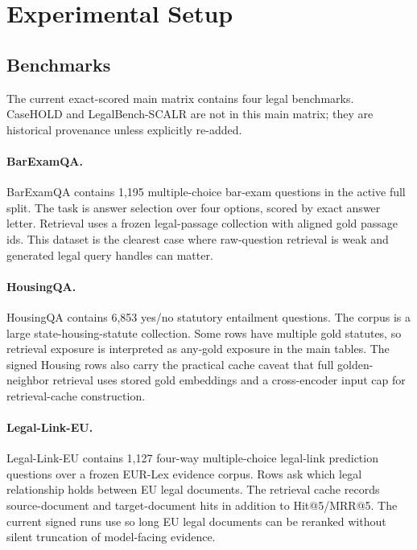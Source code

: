 \section{Experimental Setup}\label{sec:experiment}

\subsection{Benchmarks}

The current exact-scored main matrix contains four legal benchmarks. CaseHOLD
and LegalBench-SCALR are not in this main matrix; they are historical
provenance unless explicitly re-added.

\paragraph{BarExamQA.}
BarExamQA contains 1,195 multiple-choice bar-exam questions in the active full
split. The task is answer selection over four options, scored by exact answer
letter. Retrieval uses a frozen legal-passage collection with aligned gold
passage ids. This dataset is the clearest case where raw-question retrieval is
weak and generated legal query handles can matter.

\paragraph{HousingQA.}
HousingQA contains 6,853 yes/no statutory entailment questions. The corpus is a
large state-housing-statute collection. Some rows have multiple gold statutes,
so retrieval exposure is interpreted as any-gold exposure in the main tables.
The signed Housing rows also carry the practical cache caveat that full
golden-neighbor retrieval uses stored gold embeddings and a cross-encoder input
cap for retrieval-cache construction.

\paragraph{Legal-Link-EU.}
Legal-Link-EU contains 1,127 four-way multiple-choice legal-link prediction
questions over a frozen EUR-Lex evidence corpus. Rows ask which legal
relationship holds between EU legal documents. The retrieval cache records
source-document and target-document hits in addition to Hit@5/MRR@5. The
current signed runs use  so long EU
legal documents can be reranked without silent truncation of model-facing
evidence.

